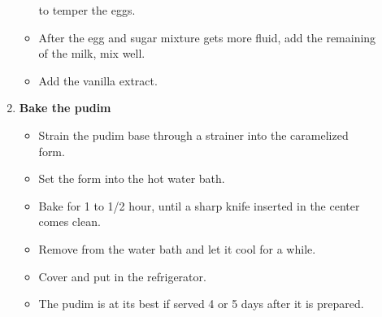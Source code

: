 \documentclass [11pt, letterpaper] {article}
\begin{document}
\begin{description}
\begin{enumerate}
\begin{itemize}
to temper the eggs.
	\item After the egg and sugar mixture gets more fluid, add the
remaining of the milk, mix well.
	\item Add the vanilla extract.
	\end{itemize}
	\item {\bf Bake the pudim}
	\begin{itemize}
	\item Strain the pudim base through a strainer into the
              caramelized form.
	\item Set the form into the hot water bath.
	\item Bake for 1 to 1/2 hour, until a sharp knife inserted in
              the center comes clean.
	\item Remove from the water bath and let it cool for a while.
	\item Cover and put in the refrigerator.
	\item The pudim is at its best if served 4 or 5 days after it
	      is prepared.
	\end{itemize}
	\end{enumerate}
\end{description}
\end{document}
